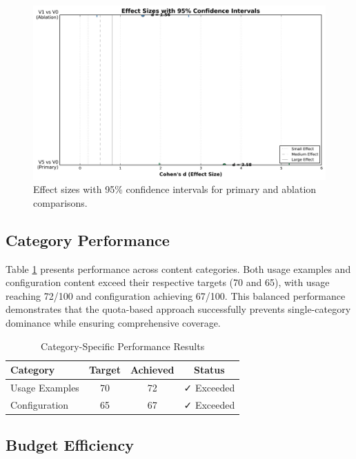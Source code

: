 \documentclass[conference]{IEEEtran}
\begin{document}
\begin{figure}[t]
\centering
\includegraphics[width=\columnwidth]{figures/effect_size_forest_plot.png}
\caption{Effect sizes with 95\% confidence intervals for primary and ablation comparisons.}
\label{fig:effect_sizes}
\end{figure}

\subsection{Category Performance}

Table \ref{tab:category_results} presents performance across content categories. Both usage examples and configuration content exceed their respective targets (70 and 65), with usage reaching 72/100 and configuration achieving 67/100. This balanced performance demonstrates that the quota-based approach successfully prevents single-category dominance while ensuring comprehensive coverage.

\begin{table}[t]
\centering
\caption{Category-Specific Performance Results}
\label{tab:category_results}
\begin{tabular}{@{}lccc@{}}
\toprule
\textbf{Category} & \textbf{Target} & \textbf{Achieved} & \textbf{Status} \\
\midrule
Usage Examples & 70 & 72 & ✓ Exceeded \\
Configuration & 65 & 67 & ✓ Exceeded \\
\bottomrule
\end{tabular}
\end{table}

\subsection{Budget Efficiency}
\end{document}

